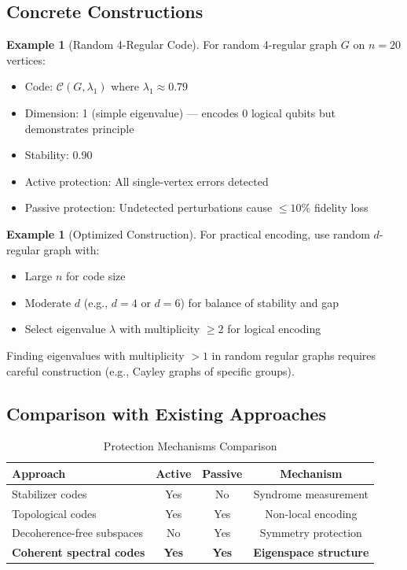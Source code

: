 \documentclass[11pt,a4paper]{article}
\theoremstyle{definition}
\newtheorem{example}[theorem]{Example}
\newcommand{\codespace}{\mathcal{C}}
\begin{document}
\subsection{Concrete Constructions}

\begin{example}[Random 4-Regular Code]
For random 4-regular graph $G$ on $n=20$ vertices:
\begin{itemize}[noitemsep]
    \item Code: $\codespace(G, \lambda_1)$ where $\lambda_1 \approx 0.79$
    \item Dimension: 1 (simple eigenvalue) --- encodes 0 logical qubits but demonstrates principle
    \item Stability: 0.90
    \item Active protection: All single-vertex errors detected
    \item Passive protection: Undetected perturbations cause $\leq 10\%$ fidelity loss
\end{itemize}
\end{example}

\begin{example}[Optimized Construction]
For practical encoding, use random $d$-regular graph with:
\begin{itemize}[noitemsep]
    \item Large $n$ for code size
    \item Moderate $d$ (e.g., $d=4$ or $d=6$) for balance of stability and gap
    \item Select eigenvalue $\lambda$ with multiplicity $\geq 2$ for logical encoding
\end{itemize}
Finding eigenvalues with multiplicity $> 1$ in random regular graphs requires careful construction (e.g., Cayley graphs of specific groups).
\end{example}

\subsection{Comparison with Existing Approaches}

\begin{table}[h]
\centering
\caption{Protection Mechanisms Comparison}
\label{tab:comparison}
\begin{tabular}{lccc}
\toprule
Approach & Active & Passive & Mechanism \\
\midrule
Stabilizer codes & Yes & No & Syndrome measurement \\
Topological codes & Yes & Yes & Non-local encoding \\
Decoherence-free subspaces & No & Yes & Symmetry protection \\
\textbf{Coherent spectral codes} & \textbf{Yes} & \textbf{Yes} & \textbf{Eigenspace structure} \\
\bottomrule
\end{tabular}
\end{table}
\end{document}
